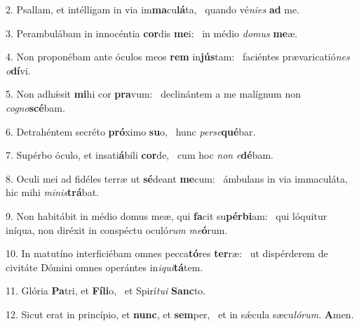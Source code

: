 2. Psallam, et intélligam in via im\textbf{ma}cu\textbf{lá}ta, \ast\  quando vé\textit{ni}\textit{es} \textbf{ad} me.\

3. Perambulábam in innocéntia \textbf{cor}dis \textbf{me}i: \ast\  in médio \textit{do}\textit{mus} \textbf{me}æ.\

4. Non proponébam ante óculos meos \textbf{rem} in\textbf{jús}tam: \ast\  faciéntes prævaricatió\textit{nes} \textit{o}\textbf{dí}vi.\

5. Non adhǽsit \textbf{mi}hi cor \textbf{pra}vum: \ast\  declinántem a me malígnum non \textit{co}\textit{gno}\textbf{scé}bam.\

6. Detrahéntem secréto \textbf{pró}ximo \textbf{su}o, \ast\  hunc \textit{per}\textit{se}\textbf{qué}bar.\

7. Supérbo óculo, et insati\textbf{á}bili \textbf{cor}de, \ast\  cum hoc \textit{non} \textit{e}\textbf{dé}bam.\

8. Oculi mei ad fidéles terræ ut \textbf{sé}deant \textbf{me}cum: \ast\  ámbulans in via immaculáta, hic mihi \textit{mi}\textit{nis}\textbf{trá}bat.\

9. Non habitábit in médio domus meæ, qui \textbf{fa}cit su\textbf{pér}\textbf{bi}am: \ast\  qui lóquitur iníqua, non diréxit in conspéctu oculó\textit{rum} \textit{me}\textbf{ó}rum.\

10. In matutíno interficiébam omnes pecca\textbf{tó}res \textbf{ter}ræ: \ast\  ut dispérderem de civitáte Dómini omnes operántes in\textit{i}\textit{qui}\textbf{tá}tem.\

11. Glória \textbf{Pa}tri, et \textbf{Fí}\textbf{li}o, \ast\  et Spirí\textit{tu}\textit{i} \textbf{Sanc}to.\

12. Sicut erat in princípio, et \textbf{nunc}, et \textbf{sem}per, \ast\  et in sǽcula sæcu\textit{ló}\textit{rum}. \textbf{A}men.\

